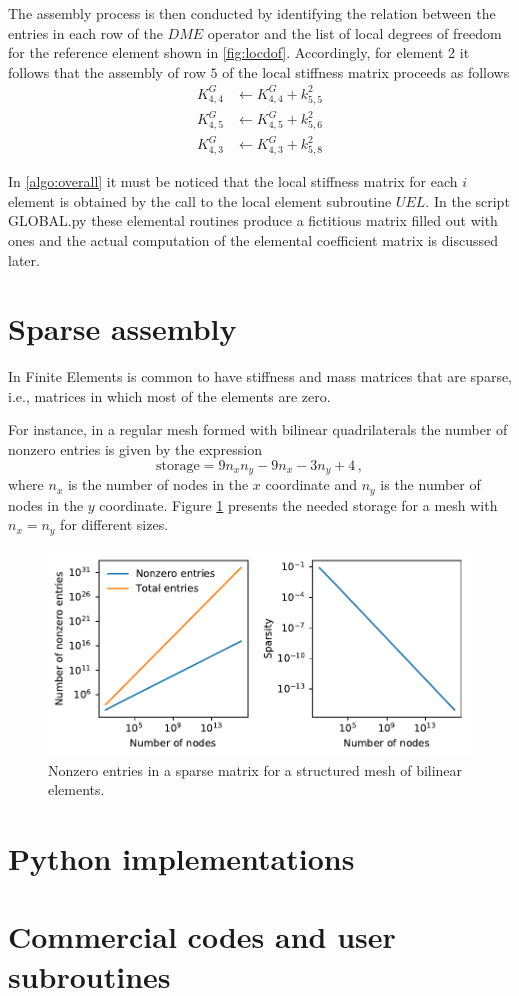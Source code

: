 The assembly process is then conducted by identifying the relation between the entries in each row of the $DME$ operator and the list of local degrees of freedom for the reference element shown in \cref{fig:locdof}. Accordingly, for element 2 it follows that the assembly of row $5$ of the local stiffness matrix proceeds as follows
\begin{align*}
K_{4,4}^G & \leftarrow  K_{4,4}^G + k_{5,5}^2 \\
K_{4,5}^G & \leftarrow  K_{4,5}^G + k_{5,6}^2 \\
K_{4,3}^G & \leftarrow  K_{4,3}^G + k_{5,8}^2
\end{align*}

In \cref{algo:overall} it must be noticed that the local stiffness matrix for each $i$ element is obtained by the call to the local element subroutine $UEL$. In the script GLOBAL.py these elemental routines produce a fictitious matrix filled out with ones and the actual computation of the elemental coefficient matrix is discussed later.


\section{Sparse assembly}
In Finite Elements is common to have stiffness and mass matrices that are sparse, i.e., matrices in which most of the elements are zero.


For instance, in a regular mesh formed with bilinear quadrilaterals the number of nonzero entries is given by the expression
\[\text{storage} = 9 n_x n_y - 9 n_x - 3 n_y + 4\, ,\]
where $n_x$ is the number of nodes in the $x$ coordinate and $n_y$ is the number of nodes in the $y$ coordinate. Figure \ref{fig:sparse_storage} presents the needed storage for a mesh with $n_x=n_y$ for different sizes.
\begin{figure}[H]
\centering
\includegraphics[width=6 in]{sparse_storage.pdf}
\caption{Nonzero entries in a sparse matrix for a structured mesh of bilinear elements.}
\label{fig:sparse_storage}
\end{figure}

\section{Python implementations}


\section{Commercial codes and user subroutines}





